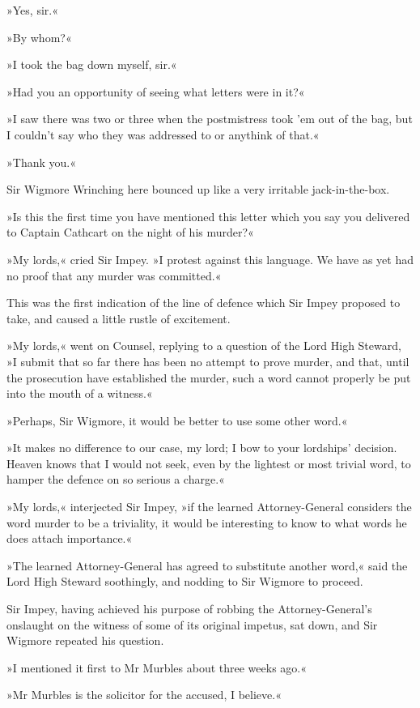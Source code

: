 »Yes, sir.«

»By whom?«

»I took the bag down myself, sir.«

»Had you an opportunity of seeing what letters were in it?«

»I saw there was two or three when the postmistress took 'em out of the bag, but I couldn't say who they was addressed to or anythink of that.«

»Thank you.«

Sir Wigmore Wrinching here bounced up like a very irritable jack-in-the-box.

»Is this the first time you have mentioned this letter which you say you delivered to Captain Cathcart on the night of his murder?«

»My lords,« cried Sir Impey. »I protest against this language. We have as yet had no proof that any murder was committed.«

This was the first indication of the line of defence which Sir Impey proposed to take, and caused a little rustle of excitement.

»My lords,« went on Counsel, replying to a question of the Lord High Steward, »I submit that so far there has been no attempt to prove murder, and that, until the prosecution have established the murder, such a word cannot properly be put into the mouth of a witness.«

»Perhaps, Sir Wigmore, it would be better to use some other word.«

»It makes no difference to our case, my lord; I bow to your lordships' decision. Heaven knows that I would not seek, even by the lightest or most trivial word, to hamper the defence on so serious a charge.«

»My lords,« interjected Sir Impey, »if the learned Attorney-General considers the word murder to be a triviality, it would be interesting to know to what words he does attach importance.«

»The learned Attorney-General has agreed to substitute another word,« said the Lord High Steward soothingly, and nodding to Sir Wigmore to proceed.

Sir Impey, having achieved his purpose of robbing the Attorney-General's onslaught on the witness of some of its original impetus, sat down, and Sir Wigmore repeated his question.

»I mentioned it first to Mr Murbles about three weeks ago.«

»Mr Murbles is the solicitor for the accused, I believe.«

